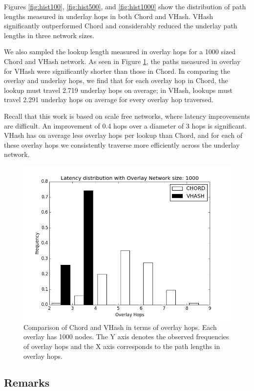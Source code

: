 Figures \ref{fig:hist100}, \ref{fig:hist500}, and \ref{fig:hist1000} show the distribution of path lengths measured in underlay hops in both Chord and VHash.   
VHash significantly outperformed Chord and considerably reduced the underlay path lengths in three network sizes.  

We also sampled the lookup length measured in overlay hops for a 1000 sized Chord and VHash network.  
As seen in Figure \ref{fig:histover}, the paths measured in overlay for VHash were significantly shorter than those in Chord. 
In comparing the overlay and underlay hops, we find that for each overlay hop in Chord, the lookup must travel 2.719 underlay hops on average; in VHash, lookups must travel 2.291 underlay hops on average for every overlay hop traversed. 

Recall that this work is based on scale free networks, where latency improvements are difficult.
An improvement of 0.4 hops over a diameter of 3 hops is significant.
VHash has on average less overlay hops per lookup than Chord, and for each of these overlay hops we consistently traverse more efficiently across the underlay network.
\begin{figure}[h]
	\centering
	\includegraphics[width=\linewidth]{figs/hist_overlay_4d}
	\caption{Comparison of Chord and VHash in terms of overlay hops.  Each overlay has 1000 nodes.  The Y axis denotes the observed frequencies of overlay hops and the X axis corresponds to the path lengths in overlay hops.}
	\label{fig:histover}
\end{figure}




\subsection{Remarks}

